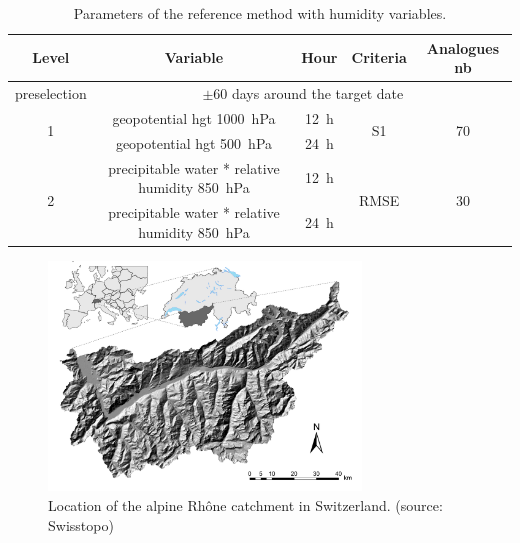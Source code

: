 \documentclass{ametsoc}
\begin{document}
\begin{table}[htbp]
	\footnotesize
	\caption{Parameters of the reference method with humidity variables.}
	\begin{center}
		\begin{tabular}{ccccc}
			\hline \textbf{Level} & \textbf{Variable} & \textbf{Hour} & \textbf{Criteria} & \textbf{Analogues nb} \\ 
			\hline 
			preselection & \multicolumn{4}{c}{$\pm 60$ days around the target date} \\
			\hline 
			\multirow{2}{*}{1} & geopotential hgt 1000~hPa & 12~h & \multirow{2}{*}{S1} & \multirow{2}{*}{70} \\
			& geopotential hgt 500~hPa & 24~h & & \\ 
			\hline
			\multirow{2}{*}{2} & precipitable water * relative humidity 850~hPa & 12~h & \multirow{2}{*}{RMSE} & \multirow{2}{*}{30} \\
			& precipitable water * relative humidity 850~hPa & 24~h & & \\ 
			\hline 
		\end{tabular} 
	\end{center}
	\label{table_params_R2}
\end{table}


%


\begin{figure}[htb]
	\centerline{\includegraphics[width=8.3cm]{figure_map.pdf}}
	\caption{Location of the alpine Rhône catchment in Switzerland. (source: Swisstopo)}
	\label{figure_map}
\end{figure}
\end{document}
